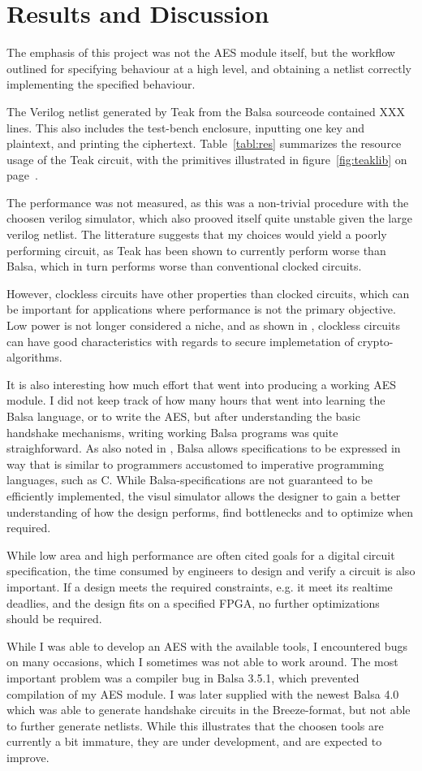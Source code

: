 \section{Results and Discussion}

The emphasis of this project was not the AES module itself, but the
workflow outlined for specifying behaviour at a high level, and
obtaining a netlist correctly implementing the specified
behaviour.

The Verilog netlist generated by Teak from the Balsa sourceode
contained XXX lines. This also includes the test-bench enclosure,
inputting one key and plaintext, and printing the
ciphertext. Table~\ref{tabl:res} summarizes the resource usage of the
Teak circuit, with the primitives illustrated in
figure~\ref{fig:teaklib} on page~\pageref{fig:teaklib}.

The performance was not measured, as this was a non-trivial procedure
with the choosen verilog simulator, which also prooved itself quite
unstable given the large verilog netlist. The litterature suggests
that my choices would yield a poorly performing circuit, as Teak has
been shown to currently perform worse than Balsa, which in turn
performs worse than conventional clocked circuits.

However, clockless circuits have other properties than clocked
circuits, which can be important for applications where performance is
not the primary objective. Low power is not longer considered a niche,
and as shown in \cite{claes}, clockless circuits can have good
characteristics with regards to secure implemetation of
crypto-algorithms.

It is also interesting how much effort that went into producing a
working AES module. I did not keep track of how many hours that went
into learning the Balsa language, or to write the AES, but after
understanding the basic handshake mechanisms, writing working Balsa
programs was quite straighforward. As also noted in \cite{xxx}, Balsa
allows specifications to be expressed in way that is similar to
programmers accustomed to imperative programming languages, such as
C. While Balsa-specifications are not guaranteed to be efficiently
implemented, the visul simulator allows the designer to gain a better
understanding of how the design performs, find bottlenecks and to
optimize when required.

While low area and high performance are often cited goals for a
digital circuit specification, the time consumed by engineers to
design and verify a circuit is also important. If a design meets the
required constraints, e.g. it meet its realtime deadlies, and the
design fits on a specified FPGA, no further optimizations should be
required.

While I was able to develop an AES with the available tools, I
encountered bugs on many occasions, which I sometimes was not able to
work around. The most important problem was a compiler bug in Balsa
3.5.1, which prevented compilation of my AES module. I was later
supplied with the newest Balsa 4.0 which was able to generate
handshake circuits in the Breeze-format, but not able to further
generate netlists. While this illustrates that the choosen tools are
currently a bit immature, they are under development, and are expected
to improve.

